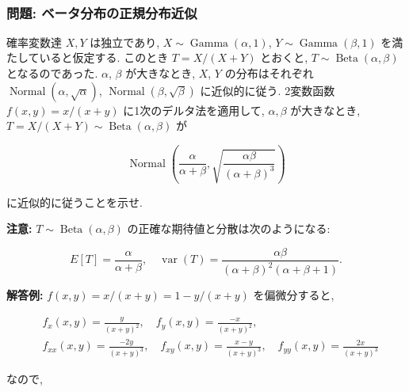 \documentclass[10pt, a4paper,xelatex,ja=standard]{bxjsarticle}
\newcommand{\prompt}[4]{
        \ttfamily\llap{{\color{#2}[#3]:\hspace{3pt}#4}}\vspace{-\baselineskip}
    }
\newcommand\op{\operatorname}
\begin{document}
            
\prompt{Out}{outcolor}{107}{}
    
    \begin{center}
    \end{center}
    { \hspace*{\fill} \\}
    

    \hypertarget{ux554fux984c-ux30d9ux30fcux30bfux5206ux5e03ux306eux6b63ux898fux5206ux5e03ux8fd1ux4f3c}{%
\subsubsection{問題:
ベータ分布の正規分布近似}\label{ux554fux984c-ux30d9ux30fcux30bfux5206ux5e03ux306eux6b63ux898fux5206ux5e03ux8fd1ux4f3c}}

確率変数達 \(X,Y\) は独立であり, \(X\sim\op{Gamma}(\alpha,1)\),
\(Y\sim\op{Gamma}(\beta,1)\) を満たしていると仮定する. このとき
\(T = X/(X+Y)\) とおくと, \(T\sim \op{Beta}(\alpha,\beta)\)
となるのであった. \(\alpha\), \(\beta\) が大きなとき, \(X\), \(Y\)
の分布はそれぞれ \(\op{Normal}(\alpha, \sqrt{\alpha})\),
\(\op{Normal}(\beta, \sqrt{\beta})\) に近似的に従う. 2変数函数
\(f(x,y)=x/(x+y)\) に1次のデルタ法を適用して, \(\alpha,\beta\)
が大きなとき, \(T=X/(X+Y)\sim \op{Beta}(\alpha,\beta)\) が

\[
\op{Normal}\left(\frac{\alpha}{\alpha+\beta}, \sqrt{\frac{\alpha\beta}{(\alpha+\beta)^3}}\right)
\]

に近似的に従うことを示せ.

\textbf{注意:} \(T\sim \op{Beta}(\alpha,\beta)\)
の正確な期待値と分散は次のようになる:

\[
E[T] = \frac{\alpha}{\alpha+\beta}, \quad
\op{var}(T) = \frac{\alpha\beta}{(\alpha+\beta)^2(\alpha+\beta+1)}.
\]

    \textbf{解答例:} \(f(x,y) = x/(x+y) = 1 - y/(x+y)\) を偏微分すると,

\[
\begin{aligned}
&
f_x(x,y) = \frac{y}{(x+y)^2}, \quad
f_y(x,y) = \frac{-x}{(x+y)^2},
\\ &
f_{xx}(x,y) = \frac{-2y}{(x+y)^3}, \quad
f_{xy}(x,y) = \frac{x-y}{(x+y)^3}, \quad
f_{yy}(x,y) = \frac{2x}{(x+y)^3}
\end{aligned}
\]

なので,
\end{document}
